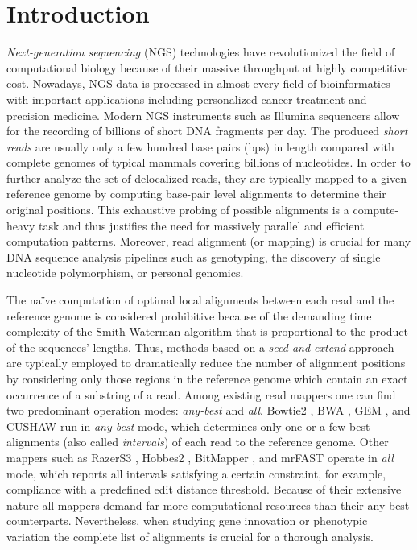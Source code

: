 \section{Introduction}
\label{Introduction}

{\em Next-generation sequencing} (NGS) technologies have
revolutionized the field of computational biology because of their
massive throughput at highly competitive cost. Nowadays, NGS data is
processed in almost every field of bioinformatics with important
applications including personalized cancer treatment and precision
medicine.  Modern NGS instruments such as Illumina sequencers
\cite{reviewngs} allow for the recording of billions of short DNA
fragments per day. The produced \emph{short reads} are usually only a
few hundred base pairs (bps) in length compared with complete genomes
of typical mammals covering billions of nucleotides. In order to
further analyze the set of delocalized reads, they are typically
mapped to a given reference genome by computing base-pair level
alignments to determine their original positions. This exhaustive
probing of possible alignments is a compute-heavy task and thus
justifies the need for massively parallel and efficient computation
patterns. Moreover, read alignment (or mapping) is crucial for many
DNA sequence analysis pipelines such as genotyping, the discovery of
single nucleotide polymorphism, or personal genomics.

The na\"ive computation of optimal local alignments between each read
and the reference genome is considered prohibitive because of the
demanding time complexity of the Smith-Waterman algorithm \cite{sw}
that is proportional to the product of the sequences' lengths. Thus,
methods based on a {\em seed-and-extend} approach are typically
employed to dramatically reduce the number of alignment positions by
considering only those regions in the reference genome which contain
an exact occurrence of a substring of a read. Among existing read
mappers one can find two predominant operation modes: {\em any-best}
and {\em all}. Bowtie2 \cite{bowtie2}, BWA \cite{bwa}, GEM \cite{gem},
and CUSHAW \cite{cushaw} run in {\em any-best} mode, which determines
only one or a few best alignments (also called {\em intervals}) of
each read to the reference genome. Other mappers such as RazerS3
\cite{razers3}, Hobbes2 \cite{hobbes2}, BitMapper \cite{bitmapper},
and mrFAST \cite{mrfast} operate in {\em all} mode, which reports all
intervals satisfying a certain constraint, for example, compliance
with a predefined edit distance threshold.  Because of their extensive
nature all-mappers demand far more computational resources than their
any-best counterparts. Nevertheless, when studying gene innovation or
phenotypic variation the complete list of alignments is crucial for a
thorough analysis.

